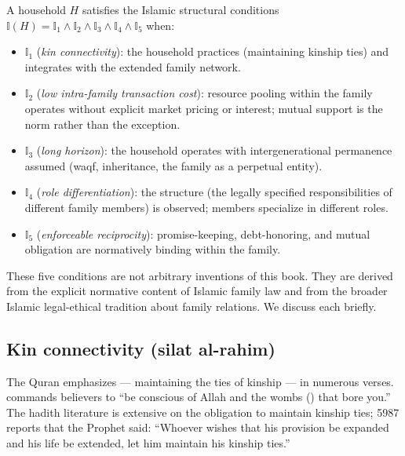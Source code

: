 \begin{conceptbox}
\label{conc:islamic-conditions}
A household $H$ satisfies the Islamic structural conditions
$\mathbb{I}(H) = \mathbb{I}_1 \land \mathbb{I}_2 \land \mathbb{I}_3
\land \mathbb{I}_4 \land \mathbb{I}_5$ when:

\begin{itemize}[leftmargin=2em]
    \item $\mathbb{I}_1$ (\emph{kin connectivity}): the household
    practices  (maintaining kinship ties) and
    integrates with the extended family network.
    \item $\mathbb{I}_2$ (\emph{low intra-family transaction
    cost}): resource pooling within the family operates without
    explicit market pricing or interest; mutual support is the
    norm rather than the exception.
    \item $\mathbb{I}_3$ (\emph{long horizon}): the household
    operates with intergenerational permanence assumed (waqf,
    inheritance, the family as a perpetual entity).
    \item $\mathbb{I}_4$ (\emph{role differentiation}): the
     structure (the legally specified responsibilities
    of different family members) is observed; members specialize in
    different roles.
    \item $\mathbb{I}_5$ (\emph{enforceable reciprocity}):
    promise-keeping, debt-honoring, and mutual obligation are
    normatively binding within the family.
\end{itemize}
\end{conceptbox}

These five conditions are not arbitrary inventions of this book.
They are derived from the explicit normative content of Islamic
family law and from the broader Islamic legal-ethical tradition
about family relations. We discuss each briefly.

\subsection{Kin connectivity (silat al-rahim)}

The Quran emphasizes  --- maintaining the ties
of kinship --- in numerous verses.  commands believers
to ``be conscious of Allah and the wombs () that bore
you.'' The hadith literature is extensive on the obligation to
maintain kinship ties;  5987 reports
that the Prophet said: ``Whoever wishes that his provision be
expanded and his life be extended, let him maintain his kinship
ties.''

